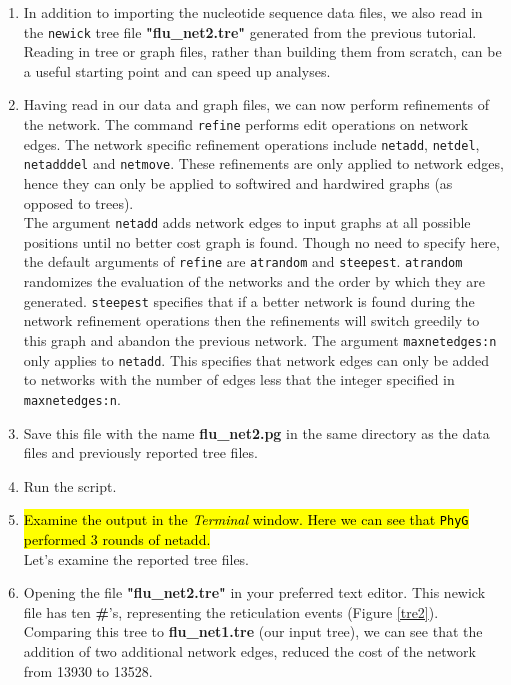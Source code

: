 \documentclass[11pt]{article}
\newcommand{\phyg}{\texttt{PhyG} }
\begin{document}
\begin {enumerate}
\item In addition to importing the nucleotide sequence data files, we also
read in the \texttt{newick} tree file \textbf{"flu\_net2.tre"} generated from the 
previous tutorial. Reading in tree or graph files, rather than building them from 
scratch, can be a useful starting point and can speed up analyses.

\item Having read in our data and graph files, we can now perform refinements 
of the network. The command \texttt{refine} performs edit operations on network 
edges. The network specific refinement operations include \texttt{netadd}, 
\texttt{netdel}, \texttt{netadddel} and \texttt{netmove}. These refinements are 
only applied to network edges, hence they can only be applied to softwired and 
hardwired graphs (as opposed to trees). \\

The argument \texttt{netadd} adds network edges to input graphs at all possible
positions until no better cost graph is found. Though no need to specify here, 
the default arguments of \texttt{refine} are \texttt{atrandom} and \texttt{steepest}.
\texttt{atrandom} randomizes the evaluation of the networks and the order by 
which they are generated. \texttt{steepest} specifies that if a better network is 
found during the network refinement operations then the refinements will switch 
greedily to this graph and abandon the previous network. The argument  
\texttt{maxnetedges:n} only applies to \texttt{netadd}. This specifies that network
edges can only be added to networks with the number of edges less that the integer 
specified in \texttt{maxnetedges:n}.

\item Save this file with the name \textbf{flu\_net2.pg} in the same directory as the 
data files and previously reported tree files.

\item Run the script.

\item \hl{Examine the output in the \textit{Terminal} window. Here we can see that 
\phyg performed 3 rounds of netadd.}\\

Let's examine the reported tree files. 

\item Opening the file \textbf{"flu\_net2.tre"} in your preferred text editor. This 
newick file has ten \textbf{\#}'s, representing the reticulation events (Figure 
\ref{tre2}). Comparing this tree to \textbf{flu\_net1.tre} (our input tree), we can 
see that the addition of two additional network edges, reduced the cost of the 
network from 13930 to 13528. 


\end{enumerate}
\end{document}
